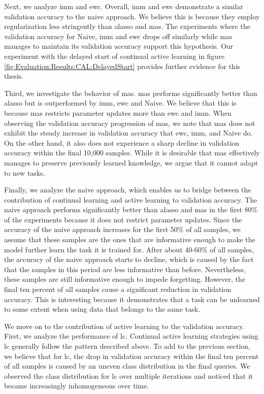 Next, we analyze \gls{imm} and \gls{ewc}. Overall, \gls{imm} and \gls{ewc} demonstrate a similar validation accuracy to the naive approach. We believe this is
because they employ regularization less stringently than \gls{alasso} and \gls{mas}. The experiments where the validation accuracy for Naive, \gls{imm} and \gls{ewc}
drops off similarly while \gls{mas} manages to maintain its validation accuracy support this hypothesis. Our experiment with the delayed start of continual active
learning in figure \ref{fig:Evaluation:Results:CAL:DelayedStart} provides further evidence for this thesis. \par
Third, we investigate the behavior of \gls{mas}. \gls{mas} performs significantly better than \gls{alasso} but is outperformed by \gls{imm}, \gls{ewc} and Naive.
We believe that this is because \gls{mas} restricts parameter updates more than \gls{ewc} and \gls{imm}. When observing the validation accuracy progression of
\gls{mas}, we note that \gls{mas} does not exhibit the steady increase in validation accuracy that \gls{ewc}, \gls{imm}, and Naive do. On the other hand,
it also does not experience a sharp decline in validation accuracy within the final 10,000 samples. While it is desirable that \gls{mas} effectively manages
to preserve previously learned knowledge, we argue that it cannot adapt to new tasks. \par

Finally, we analyze the naive approach, which enables us to bridge between the contribution of continual learning and active learning to validation accuracy.
The naive approach performs significantly better than \gls{alasso} and \gls{mas} in the first 80\% of the experiments because it does not restrict parameter updates. 
Since the accuracy of the naive approach increases for the first 50\% of all samples, we assume that these samples are the ones that are informative enough
to make the model further learn the task it is trained for. After about 40-60\% of all samples, the accuracy of the naive approach starts to decline, which is caused
by the fact that the samples in this period are less informative than before. Nevertheless, these samples are still informative enough to impede forgetting. 
However, the final ten percent of all samples cause a significant reduction in validation accuracy. This is interesting because it demonstrates that a task can be
unlearned to some extent when using data that belongs to the same task. \par
We move on to the contribution of active learning to the validation accuracy. First, we analyze the performance of \gls{lc}. Continual active learning strategies
using \gls{lc} generally follow the pattern described above. To add to the previous section, we believe that for \gls{lc}, the drop in
validation accuracy within the final ten percent of all samples is caused by an uneven class distribution in the final queries. We observed the class distribution
for \gls{lc} over multiple iterations and noticed that it became increasingly inhomogeneous over time. \par


